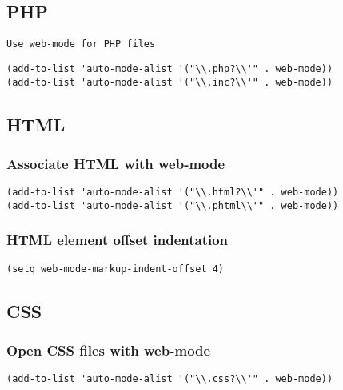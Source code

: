 \documentclass[11pt]{article}
\begin{document}
\subsection*{PHP}
\label{sec:org91eabe1}

\begin{verbatim}
Use web-mode for PHP files  
\end{verbatim}


\begin{verbatim}
(add-to-list 'auto-mode-alist '("\\.php?\\'" . web-mode))
(add-to-list 'auto-mode-alist '("\\.inc?\\'" . web-mode))
\end{verbatim}

\subsection*{HTML}
\label{sec:org7abdef3}

\subsubsection*{Associate HTML with web-mode}
\label{sec:org8de5ce5}

\begin{verbatim}
(add-to-list 'auto-mode-alist '("\\.html?\\'" . web-mode))
(add-to-list 'auto-mode-alist '("\\.phtml\\'" . web-mode))
\end{verbatim}

\subsubsection*{HTML element offset indentation}
\label{sec:org11ee253}
\begin{verbatim}
(setq web-mode-markup-indent-offset 4)
\end{verbatim}

\subsection*{CSS}
\label{sec:org89aa09f}

\subsubsection*{Open CSS files with web-mode}
\label{sec:orge8c93b5}
\begin{verbatim}
(add-to-list 'auto-mode-alist '("\\.css?\\'" . web-mode))
\end{verbatim}
\end{document}

